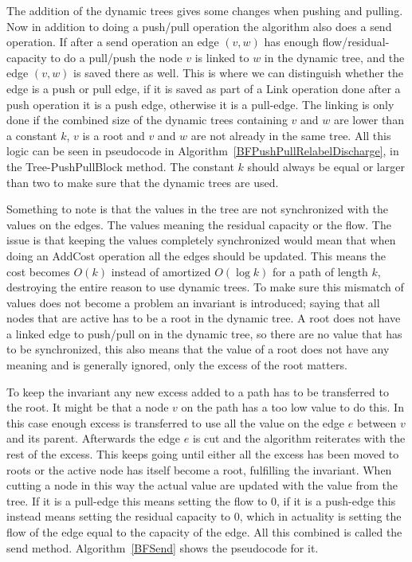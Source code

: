 The addition of the dynamic trees gives some changes when pushing and pulling. Now in addition to doing a push/pull operation the algorithm also does a send operation.
If after a send operation an edge $(v,w)$ has enough flow/residual-capacity to do a pull/push the node $v$ is linked to $w$ 
in the dynamic tree, and the edge $(v,w)$ is saved there as well. 
This is where we can distinguish whether the edge is a push or pull edge, if it is saved as part of a Link operation done after a push operation it is a push edge, 
otherwise it is a pull-edge.
The linking is only done if the combined size of the dynamic trees containing $v$ and $w$ are lower than a
constant $k$, $v$ is a root and $v$ and $w$ are not already in the same tree. All this logic can be seen in pseudocode in Algorithm~\ref{BFPushPullRelabelDischarge},
in the Tree-PushPullBlock method. The constant $k$ should always be equal or larger than two to make sure that the dynamic trees are used.

Something to note is that the values in the tree are not synchronized with the values on the edges. The values meaning the residual capacity or the flow.
The issue is that keeping the values completely synchronized would mean that when doing an AddCost operation all the edges should be updated. This
means the cost becomes $O(k)$ instead of amortized $O(\log{k})$ for a path of length $k$, destroying the entire reason to use dynamic trees.
To make sure this mismatch of values does not become a problem an invariant is introduced; saying that all nodes that are active has to be a root in the dynamic
tree. A root does not have a linked edge to push/pull on in the dynamic tree, so there are no value that has to be synchronized, this also means that the
value of a root does not have any meaning and is generally ignored, only the excess of the root matters.

To keep the invariant any new excess added to a path has to be transferred to the root. It might be that a node $v$ on the path has a too low value to do
this. In this case enough excess is transferred to use all the value on the edge $e$ between $v$ and its parent. Afterwards the edge $e$ is cut and
the algorithm reiterates with the rest of the excess. This keeps going until either all the excess has been moved to roots or the active node
has itself become a root, fulfilling the invariant. When cutting a node in this way the actual value are updated with the value from the tree.
If it is a pull-edge this means setting the flow to 0, if it is a push-edge this instead means setting the residual capacity to 0, which in actuality is setting
the flow of the edge equal to the capacity of the edge. All this combined is called the send method. Algorithm~\ref{BFSend} shows the pseudocode for it.

